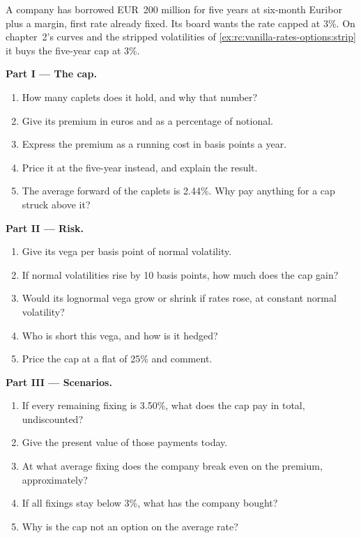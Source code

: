 \begin{problem}\label{pb:rc:vanilla-rates-options:1}
A company has borrowed EUR~200 million for five years at six-month Euribor plus
a margin, first rate already fixed. Its board wants the rate capped at 3\%. On
chapter~2's curves and the stripped volatilities of
\cref{ex:rc:vanilla-rates-options:strip} it buys the five-year cap at 3\%.

\medskip\noindent\textbf{Part I --- The cap.}
\begin{enumerate}
\item How many caplets does it hold, and why that number?
\item Give its premium in euros and as a percentage of notional.
\item Express the premium as a running cost in basis points a year.
\item Price it at the five-year  instead, and explain the result.
\item The average forward of the caplets is 2.44\%. Why pay anything for a cap
struck above it?
\end{enumerate}

\medskip\noindent\textbf{Part II --- Risk.}
\begin{enumerate}[resume]
\item Give its vega per basis point of normal volatility.
\item If normal volatilities rise by 10 basis points, how much does the cap gain?
\item Would its lognormal vega grow or shrink if rates rose, at constant normal
volatility?
\item Who is short this vega, and how is it hedged?
\item Price the cap at a flat  of 25\% and comment.
\end{enumerate}

\medskip\noindent\textbf{Part III --- Scenarios.}
\begin{enumerate}[resume]
\item If every remaining fixing is 3.50\%, what does the cap pay in total,
undiscounted?
\item Give the present value of those payments today.
\item At what average fixing does the company break even on the premium,
approximately?
\item If all fixings stay below 3\%, what has the company bought?
\item Why is the cap not an option on the average rate?
\end{enumerate}


\end{problem}
